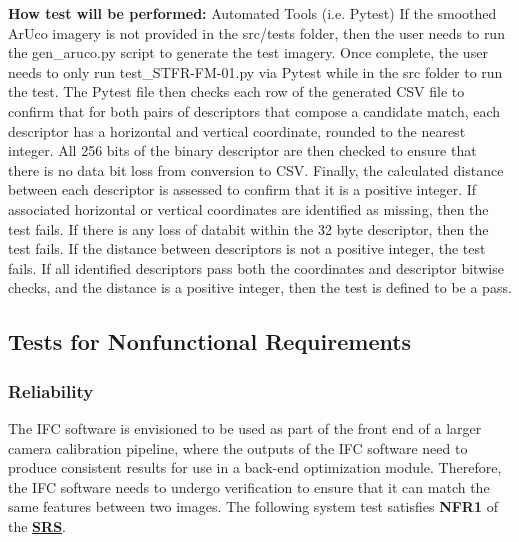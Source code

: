 \documentclass[12pt, titlepage]{article}
\begin{document}
\begin{enumerate}
\textbf{How test will be performed:} Automated Tools (i.e. Pytest)
If the smoothed ArUco imagery is not provided in the src/tests folder, then the user needs to run the gen\_aruco.py script to generate the test imagery. Once complete, the user needs to only run test\_STFR-FM-01.py via Pytest while in the src folder to run the test. The Pytest file then checks each row of the generated CSV file to confirm that for both pairs of descriptors that compose a candidate match, each descriptor has a horizontal and vertical coordinate, rounded to the nearest integer. All 256 bits of the binary descriptor are then checked to ensure that there is no data bit loss from conversion to CSV. Finally, the calculated distance between each descriptor is assessed to confirm that it is a positive integer. If associated horizontal or vertical coordinates are identified as missing, then the test fails. If there is any loss of databit within the 32 byte descriptor, then the test fails. If the distance between descriptors is not a positive integer, the test fails. If all identified descriptors pass both the coordinates and descriptor bitwise checks, and the distance is a positive integer, then the test is defined to be a pass.
\end{enumerate}

\subsection{Tests for Nonfunctional Requirements}\label{NFR_Tests}
\subsubsection{Reliability}
The IFC software is envisioned to be used as part of the front end of a larger camera calibration pipeline, 
where the outputs of the IFC software need to produce consistent results for use in a back-end optimization 
module. Therefore, the IFC software needs to undergo verification to ensure that it can match the same 
features between two images. The following system test satisfies \textbf{NFR1} of the 
\textbf{\href{https://github.com/KiranSingh15/CAS-741-Image-Correspondences/blob/main/docs/SRS/SRS.pdf}
{SRS}}.
\end{document}
